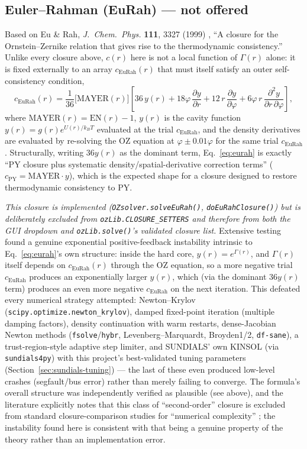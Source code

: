 \documentclass[11pt,a4paper]{article}
\newcommand{\code}[1]{\texttt{#1}}
\begin{document}
\subsection{Euler--Rahman (EuRah) --- not offered}
\label{sec:eurah}
Based on Eu \& Rah, \emph{J.\ Chem.\ Phys.} \textbf{111}, 3327 (1999)
\cite{eurah1999}, ``A closure for the Ornstein--Zernike relation that gives
rise to the thermodynamic consistency.'' Unlike every closure above, $c(r)$
here is not a local function of $\Gamma(r)$ alone: it is fixed externally to an
array $c_{\mathrm{EuRah}}(r)$ that must itself satisfy an outer self-consistency
condition,
\begin{equation}
  c_{\mathrm{EuRah}}(r) = \frac{1}{36}\Big[\mathrm{MAYER}(r)\Big]
  \left[36\,y(r) + 18\varphi\,\frac{\partial y}{\partial r} + 12\,r\,\frac{\partial y}{\partial\varphi}
  + 6\varphi\,r\,\frac{\partial^2 y}{\partial r\,\partial\varphi}\right],
  \label{eq:eurah}
\end{equation}
where $\mathrm{MAYER}(r)=\mathrm{EN}(r)-1$, $y(r)$ is the cavity function
$y(r)=g(r)e^{U(r)/k_BT}$ evaluated at the trial $c_{\mathrm{EuRah}}$, and the
density derivatives are evaluated by re-solving the OZ equation at $\varphi\pm
0.01\varphi$ for the same trial $c_{\mathrm{EuRah}}$. Structurally, writing
$36y(r)$ as the dominant term, Eq.~\ref{eq:eurah} is exactly ``PY closure plus
systematic density/spatial-derivative correction terms'' ($c_{\mathrm{PY}} =
\mathrm{MAYER}\cdot y$), which is the expected shape for a closure designed to
restore thermodynamic consistency to PY.

\emph{This closure is implemented (\code{OZsolver.solveEuRah()},
\code{doEuRahClosure()}) but is deliberately excluded from
\code{ozLib.CLOSURE\_SETTERS} and therefore from both the GUI dropdown and
\code{ozLib.solve()}'s validated closure list.} Extensive testing found a
genuine exponential positive-feedback instability intrinsic to
Eq.~\ref{eq:eurah}'s own structure: inside the hard core, $y(r)=e^{\Gamma(r)}$,
and $\Gamma(r)$ itself depends on $c_{\mathrm{EuRah}}(r)$ through the OZ
equation, so a more negative trial $c_{\mathrm{EuRah}}$ produces an
exponentially larger $y(r)$, which (via the dominant $36y(r)$ term) produces an
even more negative $c_{\mathrm{EuRah}}$ on the next iteration. This defeated
every numerical strategy attempted: Newton--Krylov (\code{scipy.optimize.newton\_krylov}),
damped fixed-point iteration (multiple damping factors), density continuation
with warm restarts, dense-Jacobian Newton methods
(\code{fsolve}/\code{hybr}, Levenberg--Marquardt, Broyden1/2, \code{df-sane}),
a trust-region-style adaptive step limiter, and SUNDIALS' own KINSOL
\cite{Hindmarsh2005} (via
\code{sundials4py}) with this project's best-validated tuning parameters
(Section~\ref{sec:sundials-tuning}) --- the last of these even produced
low-level crashes (segfault/bus error) rather than merely failing to converge.
The formula's overall structure was independently verified as plausible (see
above), and the literature explicitly notes that this class of ``second-order''
closure is excluded from standard closure-comparison studies for
``numerical complexity'' \cite{PihlajamaaJanssen2024}; the instability found here is
consistent with that being a genuine property of the theory rather than an
implementation error.
\end{document}
